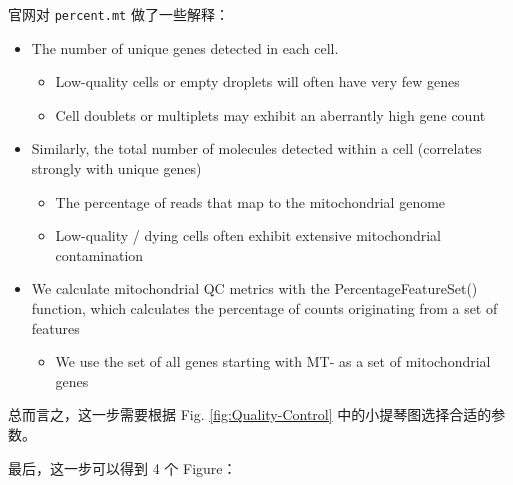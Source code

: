 \documentclass[
]{article}
\newenvironment{Shaded}{\begin{snugshade}}{\end{snugshade}}
\newcommand{\NormalTok}[1]{#1}
\newcommand{\OperatorTok}[1]{\textcolor[rgb]{0.81,0.36,0.00}{\textbf{#1}}}
\providecommand{\tightlist}{%
  \setlength{\itemsep}{0pt}\setlength{\parskip}{0pt}}
\begin{document}
官网对 \texttt{percent.mt} 做了一些解释：

\begin{itemize}
\tightlist
\item
  The number of unique genes detected in each cell.

  \begin{itemize}
  \tightlist
  \item
    Low-quality cells or empty droplets will often have very few genes
  \item
    Cell doublets or multiplets may exhibit an aberrantly high gene count
  \end{itemize}
\item
  Similarly, the total number of molecules detected within a cell (correlates
  strongly with unique genes)

  \begin{itemize}
  \tightlist
  \item
    The percentage of reads that map to the mitochondrial genome
  \item
    Low-quality / dying cells often exhibit extensive mitochondrial contamination
  \end{itemize}
\item
  We calculate mitochondrial QC metrics with the PercentageFeatureSet()
  function, which calculates the percentage of counts originating from a set of
  features

  \begin{itemize}
  \tightlist
  \item
    We use the set of all genes starting with MT- as a set of mitochondrial genes
  \end{itemize}
\end{itemize}

总而言之，这一步需要根据 Fig. \ref{fig:Quality-Control} 中的小提琴图选择合适的参数。

最后，这一步可以得到 4 个 Figure：

\begin{Shaded}
\end{Shaded}
\end{document}
